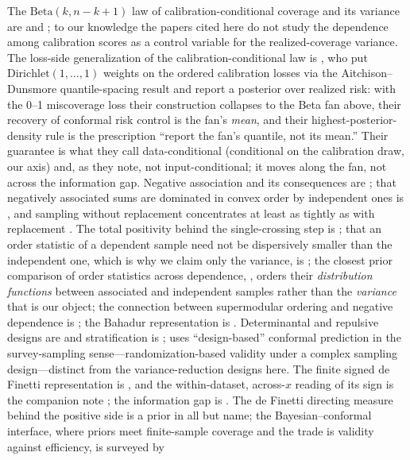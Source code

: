\documentclass[11pt]{article}
\begin{document}
The $\mathrm{Beta}(k,n-k+1)$ law of calibration-conditional coverage and its variance are
\citet{vovk2012} and \citet{marques2024}; to our knowledge the papers cited here do not study the
dependence among calibration scores as a control variable for the realized-coverage variance. The
loss-side generalization of the calibration-conditional law is \citet{snellgriffiths2025}, who put
$\mathrm{Dirichlet}(1,\dots,1)$ weights on the ordered calibration losses via the
Aitchison--Dunsmore quantile-spacing result and report a posterior over realized risk: with the
0--1 miscoverage loss their construction collapses to the Beta fan above, their recovery of
conformal risk control is the fan's \emph{mean}, and their highest-posterior-density rule is the
prescription ``report the fan's quantile, not its mean.'' Their guarantee is what they call data-conditional (conditional on the calibration draw, our axis) and, as they note, not input-conditional; it moves along the fan, not across the information gap. Negative association and its consequences are \citet{joagdev1983}; that negatively associated
sums are dominated in convex order by independent ones is \citet{shao2000}, and sampling without
replacement concentrates at least as tightly as with replacement \citep{serfling1974}. The total
positivity behind the single-crossing step is \citet{karlin1968}; that an order statistic of a
dependent sample need not be dispersively smaller than the independent one, which is why we claim
only the variance, is \citet{panja2022}; the closest prior comparison of order statistics across
dependence, \citet{huhu1998}, orders their \emph{distribution functions} between associated and
independent samples rather than the \emph{variance} that is our object; the connection between
supermodular ordering and negative dependence is \citet{christofides2004}; the Bahadur representation
is \citet{bahadur1966}. Determinantal and repulsive designs are \citet{hough2006,bardenet2016} and
stratification is \citet{cochran1977}; \citet{wieczorek2023} uses ``design-based'' conformal
prediction in the survey-sampling sense---randomization-based validity under a complex sampling
design---distinct from the variance-reduction designs here. The finite signed de Finetti representation is
\citet{kerns2006}, and the within-dataset, across-$x$ reading of its sign is the companion note
\citep{cotton_signed}; the information gap is \citep{cotton_marginally}. The de Finetti directing
measure behind the positive side is a prior in all but name; the Bayesian--conformal interface, where
priors meet finite-sample coverage and the trade is validity against efficiency, is surveyed by
\end{document}
